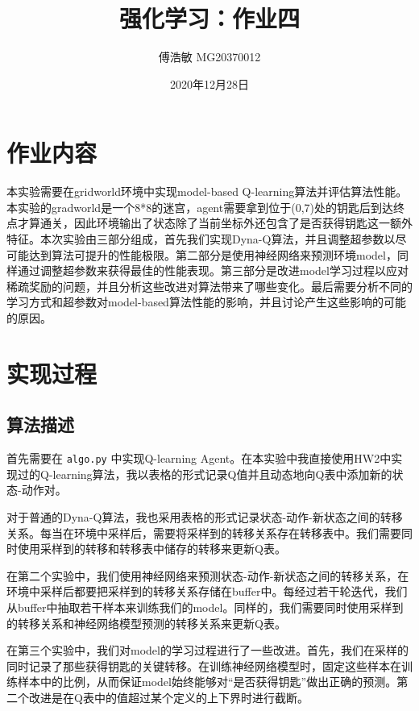 \documentclass[a4paper,12pt]{article}
\begin{document}
\begin{CJK}{UTF8}{gbsn}

\title{强化学习：作业四}

\author{傅浩敏 MG20370012}

\date{2020年12月28日}

\maketitle

\section{作业内容}
本实验需要在gridworld环境中实现model-based Q-learning算法并评估算法性能。本实验的gradworld是一个8*8的迷宫，agent需要拿到位于(0,7)处的钥匙后到达终点才算通关，因此环境输出了状态除了当前坐标外还包含了是否获得钥匙这一额外特征。本次实验由三部分组成，首先我们实现Dyna-Q算法，并且调整超参数以尽可能达到算法可提升的性能极限。第二部分是使用神经网络来预测环境model，同样通过调整超参数来获得最佳的性能表现。第三部分是改进model学习过程以应对稀疏奖励的问题，并且分析这些改进对算法带来了哪些变化。最后需要分析不同的学习方式和超参数对model-based算法性能的影响，并且讨论产生这些影响的可能的原因。

\section{实现过程}
\subsection{算法描述}
首先需要在 \texttt{algo.py} 中实现Q-learning Agent。在本实验中我直接使用HW2中实现过的Q-learning算法，我以表格的形式记录Q值并且动态地向Q表中添加新的状态-动作对。

对于普通的Dyna-Q算法，我也采用表格的形式记录状态-动作-新状态之间的转移关系。每当在环境中采样后，需要将采样到的转移关系存在转移表中。我们需要同时使用采样到的转移和转移表中储存的转移来更新Q表。

在第二个实验中，我们使用神经网络来预测状态-动作-新状态之间的转移关系，在环境中采样后都要把采样到的转移关系存储在buffer中。每经过若干轮迭代，我们从buffer中抽取若干样本来训练我们的model。同样的，我们需要同时使用采样到的转移关系和神经网络模型预测的转移关系来更新Q表。

在第三个实验中，我们对model的学习过程进行了一些改进。首先，我们在采样的同时记录了那些获得钥匙的关键转移。在训练神经网络模型时，固定这些样本在训练样本中的比例，从而保证model始终能够对“是否获得钥匙”做出正确的预测。第二个改进是在Q表中的值超过某个定义的上下界时进行截断。

\end{CJK}
\end{document}
